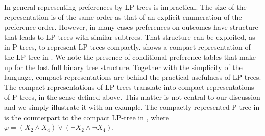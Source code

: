 In general representing preferences by LP-trees is impractical. The size of
the representation is of the same order as that of an explicit enumeration
of the preference order. However, in many cases preferences on outcomes 
have structure that leads to LP-trees with similar subtrees. That structure
can
be exploited, as in P-trees, to represent LP-trees compactly.  
 shows a compact representation of the LP-tree in  
. We note the presence of conditional preference tables 
that make up for the lost full binary tree structure. Together with the 
simplicity of the language, compact representations are behind the practical 
usefulness of LP-trees. The compact representations of LP-trees translate 
into compact representations of P-trees, in the sense defined above. This 
matter is not central to our discussion and we simply illustrate it with 
an example. The compactly represented P-tree in  is the
counterpart to the compact LP-tree in ,
where $\varphi=(X_2 \land X_4) \lor (\neg X_2 \land \neg X_4)$.

